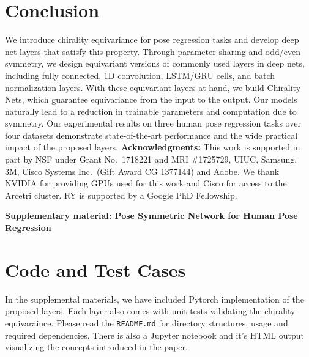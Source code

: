 \documentclass{article}
\begin{document}
 \section{Conclusion}
\label{sec:conc}
We introduce  chirality equivariance for pose regression tasks and develop deep net layers that satisfy this property. Through parameter sharing and odd/even symmetry, we design equivariant versions of  commonly used layers in deep nets, including fully connected, 1D convolution, LSTM/GRU cells, and batch normalization layers. With these equivariant layers at hand, we build Chirality Nets, which guarantee  equivariance from the input to the output. Our models naturally lead to a reduction in trainable parameters and computation due to symmetry. Our experimental results on three human pose regression tasks over four datasets demonstrate state-of-the-art performance and the wide practical impact of the proposed layers.  
\vspace{12pt}
\noindent\textbf{Acknowledgments:}
This work is supported in part by NSF under Grant No.\ 1718221 and MRI \#1725729, UIUC, Samsung, 3M, Cisco Systems Inc.\ (Gift Award CG 1377144) and Adobe. We thank NVIDIA for providing GPUs used for this work and Cisco for access to the Arcetri cluster. RY is supported by a Google PhD Fellowship.

{\small


}

\clearpage
\appendix
\renewcommand{\thetable}{A\arabic{table}}
\setcounter{table}{0}
\setcounter{figure}{0}
\renewcommand{\thetable}{A\arabic{table}}
\renewcommand\thefigure{A\arabic{figure}}
\renewcommand{\theHtable}{Appendix.\thetable}
\renewcommand{\theHfigure}{Appendix.\thefigure}

\newcommand*{\dictchar}[1]{
    \clearpage
    \twocolumn[
    \centerline{\parbox[c][3cm][c]{\textwidth}{
            \centering
            \fontsize{14}{14}
            \selectfont
            {#1}}}]
}

\onecolumn
{\centering \Large \textbf{Supplementary material: Pose Symmetric Network for Human Pose Regression}}

\section{Code and Test Cases}
In the supplemental materials, we have included Pytorch implementation of the proposed layers. Each layer also comes with unit-tests validating the chirality-equivaraince. Please read the \texttt{README.md} for directory structures, usage and required dependencies. There is also a Jupyter notebook and it's HTML output visualizing the concepts introduced in the paper. 
\end{document}

